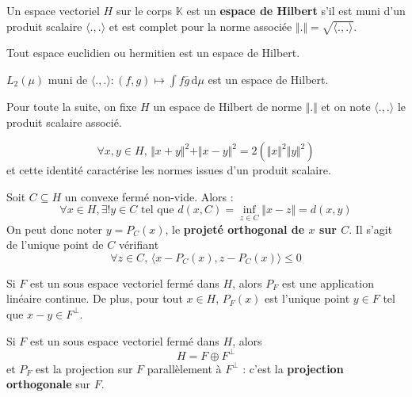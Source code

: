 
	\begin{definition}
		Un espace vectoriel $H$ sur le corps $\mathbb{K}$ est un \textbf{espace de Hilbert} s'il est muni d'un produit scalaire $\langle . , . \rangle$ et est complet pour la norme associée $\Vert . \Vert = \sqrt{\langle . , . \rangle}$.
	\end{definition}

	\begin{example}
		Tout espace euclidien ou hermitien est un espace de Hilbert.
	\end{example}

	\begin{example}
		$L_2(\mu)$ muni de $\langle . , . \rangle : (f,g) \mapsto \int f \overline{g} \, \mathrm{d}\mu$ est un espace de Hilbert.
	\end{example}

	Pour toute la suite, on fixe $H$ un espace de Hilbert de norme $\Vert . \Vert$ et on note $\langle ., . \rangle$ le produit scalaire associé.

	\begin{lemma}
		\[ \forall x, y \in H, \, \Vert x + y \Vert^2 + \Vert x - y \Vert^2 = 2(\Vert x \Vert^2 \Vert y \Vert^2) \]
		et cette identité caractérise les normes issues d'un produit scalaire.
	\end{lemma}


	\begin{theorem}
		Soit $C \subseteq H$ un convexe fermé non-vide. Alors :
		\[ \forall x \in H, \exists! y \in C \text{ tel que } d(x, C) = \inf_{z \in C} \Vert x - z \Vert = d(x, y) \]
		On peut donc noter $y = P_C(x)$, le \textbf{projeté orthogonal de $x$ sur $C$}. Il s'agit de l'unique point de $C$ vérifiant
		\[ \forall z \in C, \, \langle x - P_C(x), z - P_C(x) \rangle \leq 0 \]
	\end{theorem}

	\begin{theorem}
		Si $F$ est un sous espace vectoriel fermé dans $H$, alors $P_F$ est une application linéaire continue. De plus, pour tout $x \in H$, $P_F(x)$ est l'unique point $y \in F$ tel que $x-y \in F^\perp$.
	\end{theorem}

	\begin{theorem}
	  Si $F$ est un sous espace vectoriel fermé dans $H$, alors
	  \[ H = F \oplus F^\perp \]
	  et $P_F$ est la projection sur $F$ parallèlement à $F^\perp$ : c'est la \textbf{projection orthogonale} sur $F$.
	\end{theorem}

